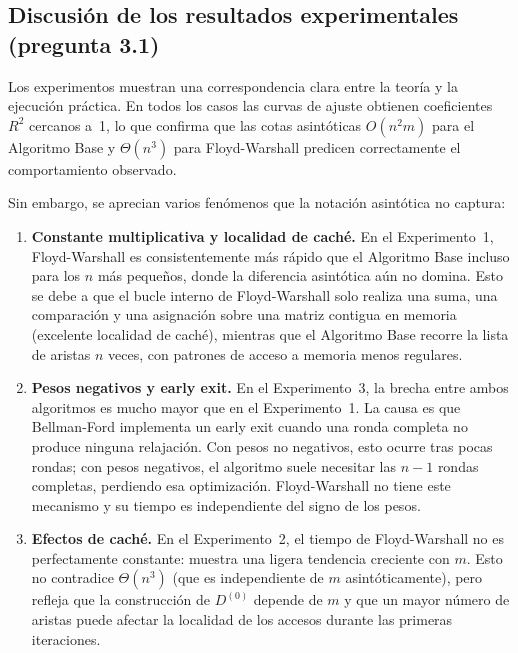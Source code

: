 \documentclass[11pt]{article}
\begin{document}
\subsection{Discusión de los resultados experimentales (pregunta 3.1)}

Los experimentos muestran una correspondencia clara entre la teoría y la
ejecución práctica. En todos los casos las curvas de ajuste obtienen
coeficientes $R^2$ cercanos a~1, lo que confirma que las cotas asintóticas
$O(n^2m)$ para el Algoritmo Base y $\Theta(n^3)$ para Floyd-Warshall predicen
correctamente el comportamiento observado.

Sin embargo, se aprecian varios fenómenos que la notación asintótica no captura:

\begin{enumerate}
  \item \textbf{Constante multiplicativa y localidad de caché.} En el
  Experimento~1, Floyd-Warshall es consistentemente más rápido que el
  Algoritmo Base incluso para los $n$ más pequeños, donde la diferencia
  asintótica aún no domina. Esto se debe a que el bucle interno de
  Floyd-Warshall solo realiza una suma, una comparación y una asignación
  sobre una matriz contigua en memoria (excelente localidad de caché),
  mientras que el Algoritmo Base recorre la lista de aristas $n$ veces, con
  patrones de acceso a memoria menos regulares.

  \item \textbf{Pesos negativos y early exit.} En el Experimento~3, la brecha
  entre ambos algoritmos es mucho mayor que en el Experimento~1. La causa es
  que Bellman-Ford implementa un early exit cuando una ronda completa no
  produce ninguna relajación. Con pesos no negativos, esto ocurre tras pocas
  rondas; con pesos negativos, el algoritmo suele necesitar las $n-1$ rondas
  completas, perdiendo esa optimización. Floyd-Warshall no tiene este
  mecanismo y su tiempo es independiente del signo de los pesos.

  \item \textbf{Efectos de caché.} En el Experimento~2, el tiempo de
  Floyd-Warshall no es perfectamente constante: muestra una ligera tendencia
  creciente con $m$. Esto no contradice $\Theta(n^3)$ (que es independiente
  de $m$ asintóticamente), pero refleja que la construcción de $D^{(0)}$
  depende de $m$ y que un mayor número de aristas puede afectar la
  localidad de los accesos durante las primeras iteraciones.


\end{enumerate}
\end{document}
